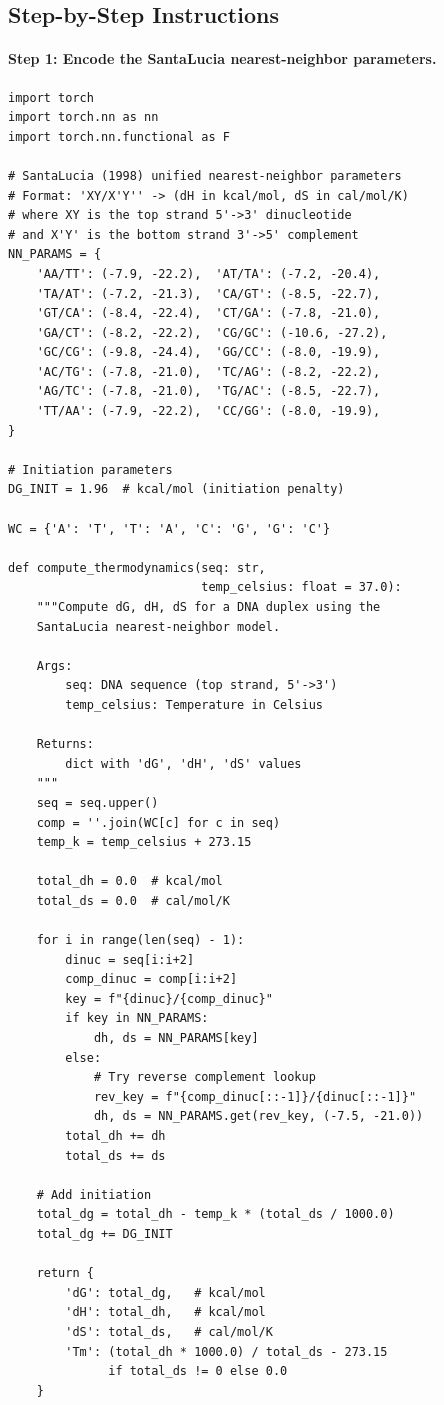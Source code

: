 \subsection{Step-by-Step Instructions}

\paragraph{Step 1: Encode the SantaLucia nearest-neighbor parameters.}

\begin{lstlisting}[style=dogmapython, caption={Lab 5: SantaLucia nearest-neighbor parameters (kcal/mol).}]
import torch
import torch.nn as nn
import torch.nn.functional as F

# SantaLucia (1998) unified nearest-neighbor parameters
# Format: 'XY/X'Y'' -> (dH in kcal/mol, dS in cal/mol/K)
# where XY is the top strand 5'->3' dinucleotide
# and X'Y' is the bottom strand 3'->5' complement
NN_PARAMS = {
    'AA/TT': (-7.9, -22.2),  'AT/TA': (-7.2, -20.4),
    'TA/AT': (-7.2, -21.3),  'CA/GT': (-8.5, -22.7),
    'GT/CA': (-8.4, -22.4),  'CT/GA': (-7.8, -21.0),
    'GA/CT': (-8.2, -22.2),  'CG/GC': (-10.6, -27.2),
    'GC/CG': (-9.8, -24.4),  'GG/CC': (-8.0, -19.9),
    'AC/TG': (-7.8, -21.0),  'TC/AG': (-8.2, -22.2),
    'AG/TC': (-7.8, -21.0),  'TG/AC': (-8.5, -22.7),
    'TT/AA': (-7.9, -22.2),  'CC/GG': (-8.0, -19.9),
}

# Initiation parameters
DG_INIT = 1.96  # kcal/mol (initiation penalty)

WC = {'A': 'T', 'T': 'A', 'C': 'G', 'G': 'C'}

def compute_thermodynamics(seq: str,
                           temp_celsius: float = 37.0):
    """Compute dG, dH, dS for a DNA duplex using the
    SantaLucia nearest-neighbor model.

    Args:
        seq: DNA sequence (top strand, 5'->3')
        temp_celsius: Temperature in Celsius

    Returns:
        dict with 'dG', 'dH', 'dS' values
    """
    seq = seq.upper()
    comp = ''.join(WC[c] for c in seq)
    temp_k = temp_celsius + 273.15

    total_dh = 0.0  # kcal/mol
    total_ds = 0.0  # cal/mol/K

    for i in range(len(seq) - 1):
        dinuc = seq[i:i+2]
        comp_dinuc = comp[i:i+2]
        key = f"{dinuc}/{comp_dinuc}"
        if key in NN_PARAMS:
            dh, ds = NN_PARAMS[key]
        else:
            # Try reverse complement lookup
            rev_key = f"{comp_dinuc[::-1]}/{dinuc[::-1]}"
            dh, ds = NN_PARAMS.get(rev_key, (-7.5, -21.0))
        total_dh += dh
        total_ds += ds

    # Add initiation
    total_dg = total_dh - temp_k * (total_ds / 1000.0)
    total_dg += DG_INIT

    return {
        'dG': total_dg,   # kcal/mol
        'dH': total_dh,   # kcal/mol
        'dS': total_ds,   # cal/mol/K
        'Tm': (total_dh * 1000.0) / total_ds - 273.15
              if total_ds != 0 else 0.0
    }
\end{lstlisting}

